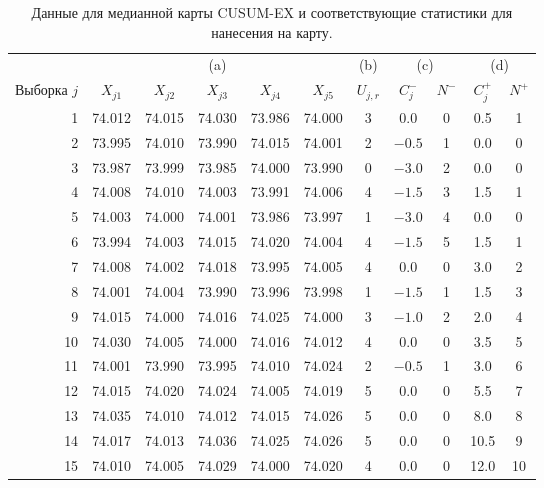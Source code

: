 \begin{table}[!ht]
	\centering
	\caption{Данные для медианной карты CUSUM-EX и соответствующие статистики для нанесения на карту.}
	\label{tab:4.25}
	\small
	\begin{tabular}{@{}rcccccccccc@{}}
		\toprule
		& \multicolumn{5}{c}{(a)} & (b) & \multicolumn{2}{c}{(c)} & \multicolumn{2}{c}{(d)} \\ \cmidrule(lr){2-6}\cmidrule(lr){8-9}\cmidrule(lr){10-11}
		\multicolumn{1}{c}{Выборка \(j\)} & \(X_{j1}\) & \(X_{j2}\) & \(X_{j3}\) & \(X_{j4}\) & \(X_{j5}\) & \(U_{j,r}\) & \(C_j^-\) & \(N^-\) & \(C_j^+\) & \(N^+\) \\
		\midrule
		1 & 74.012 & 74.015 & 74.030 & 73.986 & 74.000 & 3 & 0.0 & 0 & 0.5 & 1 \\
		2 & 73.995 & 74.010 & 73.990 & 74.015 & 74.001 & 2 & \(-0.5\) & 1 & 0.0 & 0 \\
		3 & 73.987 & 73.999 & 73.985 & 74.000 & 73.990 & 0 & \(-3.0\) & 2 & 0.0 & 0 \\
		4 & 74.008 & 74.010 & 74.003 & 73.991 & 74.006 & 4 & \(-1.5\) & 3 & 1.5 & 1 \\
		5 & 74.003 & 74.000 & 74.001 & 73.986 & 73.997 & 1 & \(-3.0\) & 4 & 0.0 & 0 \\
		6 & 73.994 & 74.003 & 74.015 & 74.020 & 74.004 & 4 & \(-1.5\) & 5 & 1.5 & 1 \\
		7 & 74.008 & 74.002 & 74.018 & 73.995 & 74.005 & 4 & 0.0 & 0 & 3.0 & 2 \\
		8 & 74.001 & 74.004 & 73.990 & 73.996 & 73.998 & 1 & \(-1.5\) & 1 & 1.5 & 3 \\
		9 & 74.015 & 74.000 & 74.016 & 74.025 & 74.000 & 3 & \(-1.0\) & 2 & 2.0 & 4 \\
		10 & 74.030 & 74.005 & 74.000 & 74.016 & 74.012 & 4 & 0.0 & 0 & 3.5 & 5 \\
		11 & 74.001 & 73.990 & 73.995 & 74.010 & 74.024 & 2 & \(-0.5\) & 1 & 3.0 & 6 \\
		12 & 74.015 & 74.020 & 74.024 & 74.005 & 74.019 & 5 & 0.0 & 0 & 5.5 & 7 \\
		13 & 74.035 & 74.010 & 74.012 & 74.015 & 74.026 & 5 & 0.0 & 0 & 8.0 & 8 \\
		14 & 74.017 & 74.013 & 74.036 & 74.025 & 74.026 & 5 & 0.0 & 0 & 10.5 & 9 \\
		15 & 74.010 & 74.005 & 74.029 & 74.000 & 74.020 & 4 & 0.0 & 0 & 12.0 & 10 \\
		\bottomrule
	\end{tabular}
\end{table}

